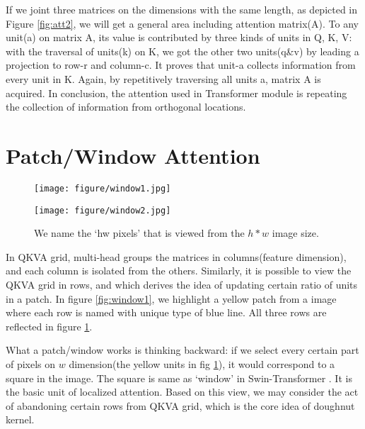 \documentclass{article}
\theoremstyle{plain}
\theoremstyle{definition}
\theoremstyle{remark}
\begin{document}
If we joint three matrices on the dimensions with the same length, as depicted in Figure \ref{fig:att2}, we will get a general area including attention matrix(A). To any unit(a) on matrix A, its value is contributed by three kinds of units in Q, K, V: with the traversal of units(k) on K, we got the other two units(q\&v) by leading a projection to row-r and column-c. It proves that unit-a collects information from every unit in K. Again, by repetitively traversing all units a, matrix A is acquired. In conclusion, the attention used in Transformer module is repeating the collection of information from orthogonal locations.

\section{Patch/Window Attention}
\begin{figure}[h]
  \centering
  \begin{minipage}[t]{0.3\textwidth}
  \centering
  \texttt{[image: figure/window1.jpg]}
  \caption{}
  \label{fig:window1}
  \end{minipage}
  \begin{minipage}[t]{0.65\textwidth} 
  \centering  
  \texttt{[image: figure/window2.jpg]}
  \caption{We name the `hw pixels' that is viewed from the $h*w$ image size.}
  \label{fig:window2}
  \end{minipage}   
\end{figure}
In QKVA grid, multi-head groups the matrices in columns(feature dimension), and each column is isolated from the others. Similarly, it is possible to view the QKVA grid in rows, and which derives the idea of updating certain ratio of units in a patch. In figure \ref{fig:window1}, we highlight a yellow patch from a image where each row is named with unique type of blue line. All three rows are reflected in figure \ref{fig:window2}.

What a patch/window works is thinking backward: if we select every certain part of pixels on $w$ dimension(the yellow units in fig \ref{fig:window2}), it would correspond to a square in the image. The square is same as `window' in Swin-Transformer \cite{liu2021swin}. It is the basic unit of localized attention. Based on this view, we may consider the act of abandoning certain rows from QKVA grid, which is the core idea of doughnut kernel.
\end{document}
